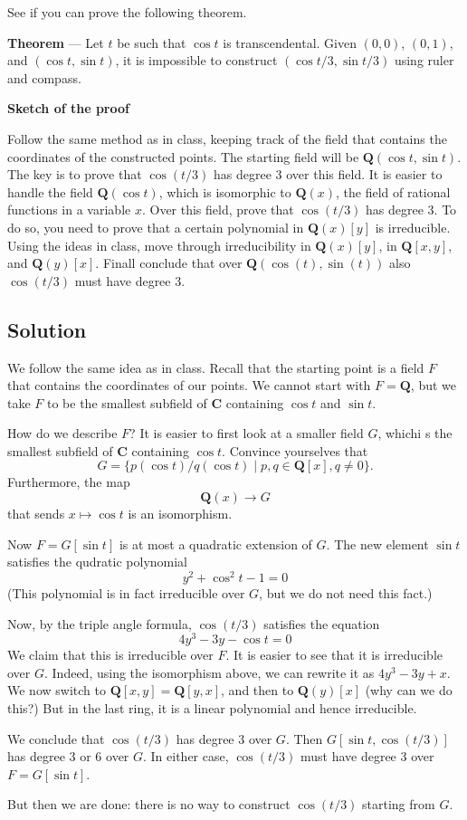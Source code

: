 \documentclass[12pt]{amsart}
\begin{document}
See if you can prove the following theorem.

\bigskip

\noindent
\textbf{\textbf{Theorem}} ---
Let \(t\) be such that \(\cos t\) is transcendental.
Given \((0,0)\), \((0,1)\), and \((\cos t, \sin t)\), it is impossible to construct \((\cos t/3, \sin t/3)\) using ruler and compass.

\bigskip

\noindent
\textbf{\textbf{Sketch of the proof}}

Follow the same method as in class, keeping track of the field that contains the coordinates of the constructed points.
The starting field will be \(\mathbf{Q}(\cos t, \sin t)\).
The key is to prove that \(\cos (t/3)\) has degree 3 over this field.
It is easier to handle the field \(\mathbf{Q}(\cos t)\), which is isomorphic to \(\mathbf{Q}(x)\), the field of rational functions in a variable \(x\).
Over this field, prove that \(\cos(t/3)\) has degree 3.
To do so, you need to prove that a certain polynomial in \(\mathbf{Q}(x)[y]\) is irreducible.
Using the ideas in class, move through irreducibility in \(\mathbf{Q}(x)[y]\), in \(\mathbf{Q}[x,y]\), and \(\mathbf{Q}(y)[x]\).
Finall conclude that over \(\mathbf{Q}(\cos(t), \sin(t))\) also \(\cos(t/3)\) must have degree 3.
\subsection*{Solution}
\label{sec:org1b78e20}
We follow the same idea as in class.
Recall that the starting point is a field \(F\) that contains the coordinates of our points.
We cannot start with \(F = \mathbf{Q}\), but we take \(F\) to be the smallest subfield of \(\mathbf{C}\) containing \(\cos t\) and \(\sin t\).

How do we describe \(F\)?
It is easier to first look at a smaller field \(G\), whichi s the smallest subfield of \(\mathbf{C}\) containing \(\cos t\).
Convince yourselves that
\[ G = \{p(\cos t)/q(\cos t) \mid p, q \in \mathbf{Q}[x], q \neq 0\}.\]
Furthermore, the map
\[ \mathbf{Q}(x) \to G\]
that sends \(x \mapsto \cos t\) is an isomorphism.

Now \(F = G[\sin t]\) is at most a quadratic extension of \(G\).
The new element \(\sin t\) satisfies the qudratic polynomial
\[ y^2 + \cos^{2} t - 1 =  0\]
(This polynomial is in fact irreducible over \(G\), but we do not need this fact.)

Now, by the triple angle formula, \(\cos(t/3)\) satisfies the equation
\[ 4 y^3 - 3 y - \cos t = 0\]
We claim that this is irreducible over \(F\).
It is easier to see that it is irreducible over \(G\).
Indeed, using the isomorphism above, we can rewrite it as \(4y^3 - 3y + x\).
We now switch to \(\mathbf{Q}[x,y] = \mathbf{Q}[y,x]\), and then to \(\mathbf{Q}(y)[x]\) (why can we do this?)
But in the last ring, it is a linear polynomial and hence irreducible.

We conclude that \(\cos(t/3)\) has degree 3 over \(G\).
Then \(G[\sin t, \cos(t/3)]\) has degree 3 or 6 over \(G\).
In either case, \(\cos(t/3)\) must have degree 3 over \(F = G[\sin t]\).

But then we are done: there is no way to construct \(\cos (t/3)\) starting from \(G\).
\end{document}
